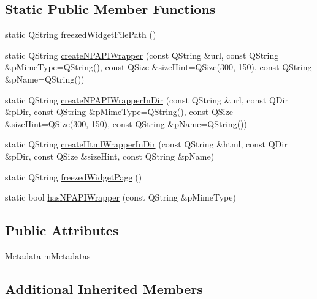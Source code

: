 \subsection*{Static Public Member Functions}
\begin{DoxyCompactItemize}
\item 
static Q\-String \hyperlink{class_u_b_graphics_w3_c_widget_item_adc5e2a6da0f030dbcf3b1fe0b4f1cfd6}{freezed\-Widget\-File\-Path} ()
\item 
static Q\-String \hyperlink{class_u_b_graphics_w3_c_widget_item_a45afba72a128d4ce3b27b4de99d0e062}{create\-N\-P\-A\-P\-I\-Wrapper} (const Q\-String \&url, const Q\-String \&p\-Mime\-Type=Q\-String(), const Q\-Size \&size\-Hint=Q\-Size(300, 150), const Q\-String \&p\-Name=Q\-String())
\item 
static Q\-String \hyperlink{class_u_b_graphics_w3_c_widget_item_aa600fe33fda69ff52f6c7b53282841b9}{create\-N\-P\-A\-P\-I\-Wrapper\-In\-Dir} (const Q\-String \&url, const Q\-Dir \&p\-Dir, const Q\-String \&p\-Mime\-Type=Q\-String(), const Q\-Size \&size\-Hint=Q\-Size(300, 150), const Q\-String \&p\-Name=Q\-String())
\item 
static Q\-String \hyperlink{class_u_b_graphics_w3_c_widget_item_af65cfcecde8aa33922370ea005d3c42b}{create\-Html\-Wrapper\-In\-Dir} (const Q\-String \&html, const Q\-Dir \&p\-Dir, const Q\-Size \&size\-Hint, const Q\-String \&p\-Name)
\item 
static Q\-String \hyperlink{class_u_b_graphics_w3_c_widget_item_a3ceef81617879b75ed7444a9046f4970}{freezed\-Widget\-Page} ()
\item 
static bool \hyperlink{class_u_b_graphics_w3_c_widget_item_ab7c1b71b5a368d121c32d3351b6d1fc4}{has\-N\-P\-A\-P\-I\-Wrapper} (const Q\-String \&p\-Mime\-Type)
\end{DoxyCompactItemize}
\subsection*{Public Attributes}
\begin{DoxyCompactItemize}
\item 
\hyperlink{class_u_b_graphics_w3_c_widget_item_1_1_metadata}{Metadata} \hyperlink{class_u_b_graphics_w3_c_widget_item_a284f897d34b6a692ad2f774a6fb4acdf}{m\-Metadatas}
\end{DoxyCompactItemize}
\subsection*{Additional Inherited Members}


